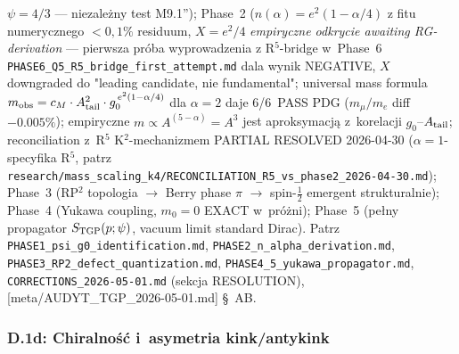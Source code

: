\begin{remark}
\begin{enumerate}[nosep]
    $\psi=4/3$ --- niezale\.zny test M9.1''); Phase~2 ($n(\alpha)
    = e^2(1-\alpha/4)$ z fitu numerycznego $<0{,}1\%$ residuum,
    $X=e^2/4$ \emph{empiryczne odkrycie awaiting RG-derivation}
    --- pierwsza pr\'oba wyprowadzenia z R$^5$-bridge w~Phase~6
    \texttt{PHASE6\_Q5\_R5\_bridge\_first\_attempt.md} dala wynik
    NEGATIVE, $X$ downgraded do "leading candidate, nie fundamental";
    universal mass formula $m_{\rm obs} = c_M \cdot A_{\rm tail}^2
    \cdot g_0^{\,e^2(1-\alpha/4)}$ dla $\alpha=2$ daje 6/6~PASS PDG
    ($m_\mu/m_e$ diff~$-0.005\%$); empiryczne $m\propto A^{(5-\alpha)}=A^3$
    jest aproksymacj\k{a} z~korelacji $g_0$--$A_{\rm tail}$;
    reconciliation z~R$^5$ K$^2$-mechanizmem PARTIAL RESOLVED
    2026-04-30 ($\alpha=1$-specyfika R$^5$, patrz
    \texttt{research/mass\_scaling\_k4/RECONCILIATION\_R5\_vs\_phase2\_2026-04-30.md});
    Phase~3 (RP$^2$ topologia $\to$ Berry phase $\pi$ $\to$
    spin-$\frac{1}{2}$ emergent strukturalnie); Phase~4
    (Yukawa coupling, $m_0=0$ EXACT w~pr\'o\.zni); Phase~5
    (pe\l{}ny propagator $S_{\rm TGP}(p;\psi)$, vacuum limit
    standard Dirac). Patrz \texttt{PHASE1\_psi\_g0\_identification.md},
    \texttt{PHASE2\_n\_alpha\_derivation.md},
    \texttt{PHASE3\_RP2\_defect\_quantization.md},
    \texttt{PHASE4\_5\_yukawa\_propagator.md},
    \texttt{CORRECTIONS\_2026-05-01.md} (sekcja RESOLUTION),
    [meta/AUDYT\_TGP\_2026-05-01.md] \S~AB.
\end{enumerate}
\end{remark}

\subsubsection{D.1d: Chiralno\'s\'c i~asymetria kink/antykink}
\label{sssec:chirality-D1d}

